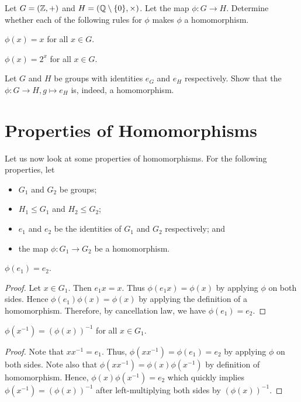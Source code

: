 \begin{exercise}
    Let $G = (\mathbb{Z}, +)$ and $H = (\mathbb{Q} \setminus \{0\}, \times)$. Let the map $\phi: G \to H$. Determine whether each of the following rules for $\phi$ makes $\phi$ a homomorphism.
    \begin{partquestions}{\alph*}
        \item $\phi(x) = x$ for all $x \in G$.
        \item $\phi(x) = 2^x$ for all $x \in G$.
    \end{partquestions}
\end{exercise}
\begin{exercise}
    Let $G$ and $H$ be groups with identities $e_G$ and $e_H$ respectively. Show that the  $\phi: G \to H, g \mapsto e_H$ is, indeed, a homomorphism.
\end{exercise}

\section{Properties of Homomorphisms}
Let us now look at some properties of homomorphisms. For the following properties, let
\begin{itemize}
    \item $G_1$ and $G_2$ be groups;
    \item $H_1 \leq G_1$ and $H_2 \leq G_2$;
    \item $e_1$ and $e_2$ be the identities of $G_1$ and $G_2$ respectively; and
    \item the map $\phi: G_1 \to G_2$ be a homomorphism.
\end{itemize}

\begin{proposition}\label{prop-homomorphism-maps-identities-to-each-other}
    $\phi(e_1) = e_2$.
\end{proposition}
\begin{proof}
    Let $x \in G_1$. Then $e_1x = x$. Thus $\phi(e_1x) = \phi(x)$ by applying $\phi$ on both sides. Hence $\phi(e_1)\phi(x) = \phi(x)$ by applying the definition of a homomorphism. Therefore, by cancellation law, we have $\phi(e_1) = e_2$.
\end{proof}

\begin{proposition}\label{prop-homomorphism-maps-inverses}
    $\phi(x^{-1}) = \left(\phi(x)\right)^{-1}$ for all $x \in G_1$.
\end{proposition}
\begin{proof}
    Note that $xx^{-1} = e_1$. Thus, $\phi(xx^{-1}) = \phi(e_1) = e_2$ by applying $\phi$ on both sides. Note also that $\phi(xx^{-1}) = \phi(x)\phi(x^{-1})$ by definition of homomorphism. Hence, $\phi(x)\phi(x^{-1}) = e_2$ which quickly implies $\phi(x^{-1}) = \left(\phi(x)\right)^{-1}$ after left-multiplying both sides by $\left(\phi(x)\right)^{-1}$.
\end{proof}

